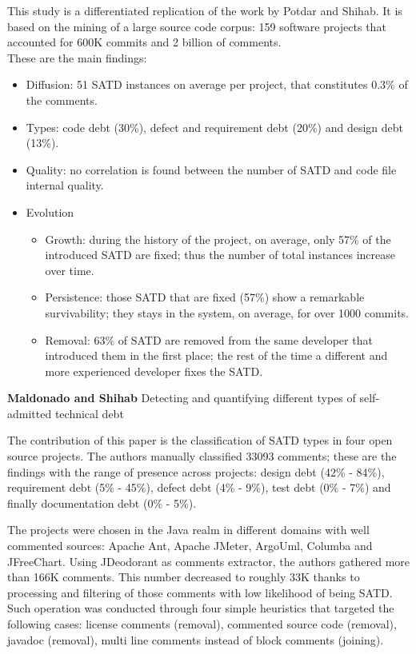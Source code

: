 This study is a differentiated replication of the work by Potdar and Shihab. It is based on the mining of a large source code corpus: 159 software projects that accounted for 600K commits and 2 billion of comments. 
\\
These are the main findings:
\begin{itemize}
\item Diffusion: 51 SATD instances on average per project, that constitutes 0.3\% of the comments.
\item Types: code debt (30\%), defect and requirement debt (20\%) and design debt (13\%).
\item Quality: no correlation is found between the number of SATD and code file internal quality.
\item Evolution
\begin{itemize}
\item Growth: during the history of the project, on average, only 57\% of the introduced SATD are fixed; thus the number of total instances increase over time.
\item Persistence:  those SATD that are fixed (57\%) show a remarkable survivability; they stays in the system, on average, for over 1000 commits.
\item Removal: 63\% of SATD are removed from the same developer that introduced them in the first place; the rest of the time a different and more experienced developer fixes the SATD.
\end{itemize}
\end{itemize}



\textbf{Maldonado and Shihab} \cite{maldonado2015detecting} Detecting and quantifying different types of self-admitted technical debt

The contribution of this paper is the classification of SATD types in four open source projects. The authors manually classified 33093 comments; these are the findings with the range of presence across projects: design debt (42\% - 84\%), requirement debt (5\% - 45\%), defect debt (4\% - 9\%), test debt (0\% - 7\%) and finally documentation debt (0\% - 5\%).

The projects were chosen in the Java realm in different domains with well commented sources: Apache Ant, Apache JMeter, ArgoUml, Columba and JFreeChart. 
Using JDeodorant as comments extractor, the authors gathered more than 166K comments. This number decreased to roughly 33K thanks to processing and filtering of those comments with low likelihood of being SATD. Such operation was conducted through four simple heuristics that targeted the following cases: license comments (removal), commented source code (removal), javadoc (removal), multi line comments instead of block comments (joining). 

